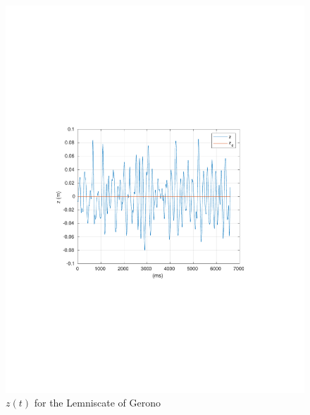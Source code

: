 \begin{frame}
	\begin{figure}[!htb]
		\centering
		\includegraphics[scale=.7,trim={3.5cm 8cm 4cm 8cm},clip]{figuras/CROB_Fuzzy_Gerono/z.pdf}
		\caption{$z(t)$ for the Lemniscate of Gerono}
		\label{fig:crob_lem_z}
	\end{figure}
\end{frame}
